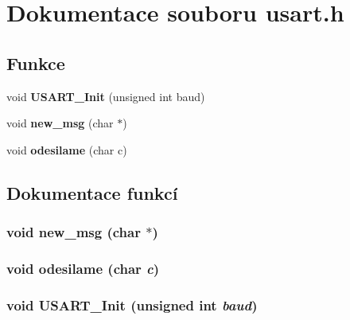 \section{Dokumentace souboru usart.h}
\label{usart_8h}
\subsection*{Funkce}
\begin{CompactItemize}
\item 
void {\bf USART\_\-Init} (unsigned int baud)
\item 
void {\bf new\_\-msg} (char $\ast$)
\item 
void {\bf odesilame} (char c)
\end{CompactItemize}


\subsection{Dokumentace funkcí}
\subsubsection{\setlength{\rightskip}{0pt plus 5cm}void new\_\-msg (char $\ast$)}\label{usart_8h_f7f7e8050594c5346c22172e19d3c193}


\subsubsection{\setlength{\rightskip}{0pt plus 5cm}void odesilame (char {\em c})}\label{usart_8h_1ff35b59737fc6dce1a47fbd8f878cfe}


\subsubsection{\setlength{\rightskip}{0pt plus 5cm}void USART\_\-Init (unsigned int {\em baud})}\label{usart_8h_c6ebeb4ed2c70b120906228519a9c246}


